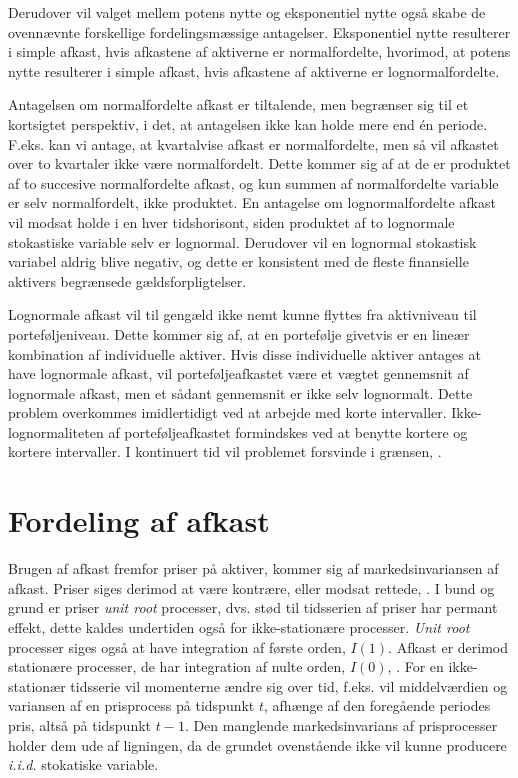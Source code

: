 \documentclass[
  a4paper,
  oneside]{memoir}
\begin{document}
Derudover vil valget mellem potens nytte og eksponentiel nytte også skabe de ovennævnte forskellige fordelingsmæssige antagelser. Eksponentiel nytte resulterer i simple afkast, hvis afkastene af aktiverne er normalfordelte, hvorimod, at potens nytte resulterer i simple afkast, hvis afkastene af aktiverne er lognormalfordelte.

Antagelsen om normalfordelte afkast er tiltalende, men begrænser sig til et kortsigtet perspektiv, i det, at antagelsen ikke kan holde mere end én periode. F.eks. kan vi antage, at kvartalvise afkast er normalfordelte, men så vil afkastet over to kvartaler ikke være normalfordelt. Dette kommer sig af at de er produktet af to succesive normalfordelte afkast, og kun summen af normalfordelte variable er selv normalfordelt, ikke produktet. En antagelse om lognormalfordelte afkast vil modsat holde i en hver tidshorisont, siden produktet af to lognormale stokastiske variable selv er lognormal. Derudover vil en lognormal stokastisk variabel aldrig blive negativ, og dette er konsistent med de fleste finansielle aktivers begrænsede gældsforpligtelser.

Lognormale afkast vil til gengæld ikke nemt kunne flyttes fra aktivniveau til porteføljeniveau. Dette kommer sig af, at en portefølje givetvis er en lineær kombination af individuelle aktiver. Hvis disse individuelle aktiver antages at have lognormale afkast, vil porteføljeafkastet være et vægtet gennemsnit af lognormale afkast, men et sådant gennemsnit er ikke selv lognormalt. Dette problem overkommes imidlertidigt ved at arbejde med korte intervaller. Ikke-lognormaliteten af porteføljeafkastet formindskes ved at benytte kortere og kortere intervaller. I kontinuert tid vil problemet forsvinde i grænsen, \citep{CampVic2003}.

\hypertarget{fordafafk}{%
\section{Fordeling af afkast}\label{fordafafk}}

Brugen af afkast fremfor priser på aktiver, kommer sig af markedsinvariansen af afkast. Priser siges derimod at være kontrære, eller modsat rettede, \citep{Jondeau2007}. I bund og grund er priser \emph{unit root} processer, dvs. stød til tidsserien af priser har permant effekt, dette kaldes undertiden også for ikke-stationære processer. \emph{Unit root} processer siges også at have integration af første orden, \(I(1)\). Afkast er derimod stationære processer, de har integration af nulte orden, \(I(0)\), \citep{Verbeek2017}. For en ikke-stationær tidsserie vil momenterne ændre sig over tid, f.eks. vil middelværdien og variansen af en prisprocess på tidspunkt \(t\), afhænge af den foregående periodes pris, altså på tidspunkt \(t-1\). Den manglende markedsinvarians af prisprocesser holder dem ude af ligningen, da de grundet ovenstående ikke vil kunne producere \emph{i.i.d.} stokatiske variable.
\end{document}
